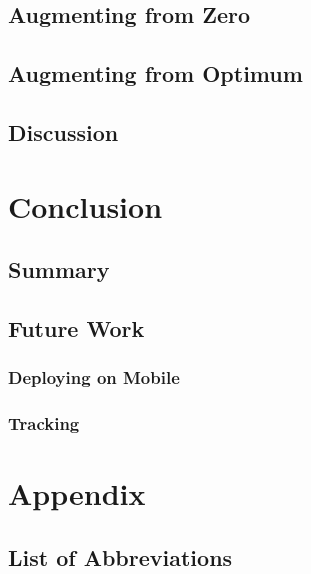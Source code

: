 \documentclass[10pt]{book}
\begin{document}
\section{Augmenting from Zero}

\section{Augmenting from Optimum}

\section{Discussion}


\chapter{Conclusion}
\label{chap:conclusion}

\section{Summary}

\section{Future Work}

\subsection{Deploying on Mobile}

\subsection{Tracking}

\chapter{Appendix}

\section{List of Abbreviations}
\end{document}

